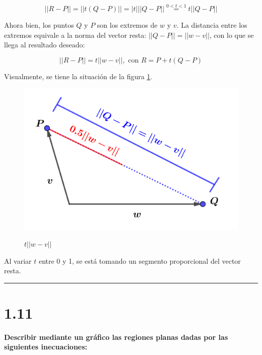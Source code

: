 \documentclass{article}
\begin{document}
\begin{equation}
||R-P|| = ||t (Q-P)|| = |t| ||Q - P|| \overset{0<t<1}{=} t ||Q-P||
\end{equation}

Ahora bien, los puntos $Q$ y $P$ son los extremos de $w$ y $v$. La distancia entre los extremos equivale a la norma del vector resta: $||Q-P|| = ||w-v||$, con lo que se llega al resultado deseado:

\begin{equation}
||R-P|| = t ||w-v||, \text{ con } R = P + t (Q-P)
\end{equation}

Visualmente, se tiene la situación de la figura \ref{fig:1-10-b}.  

\begin{figure}[ht]
\caption{$t ||w-v||$}
\includegraphics[scale=1]{../img/exercises/guide_01/10_b.png} 
\centering
\label{fig:1-10-b}
\end{figure}

Al variar $t$ entre 0 y 1, se está tomando un segmento proporcional del vector resta. 

\hrule
\vspace{10 pt}

\section*{1.11}
\label{sec:1.11}

\textbf{Describir mediante un gráfico las regiones planas dadas por las siguientes inecuaciones:}
\end{document}
